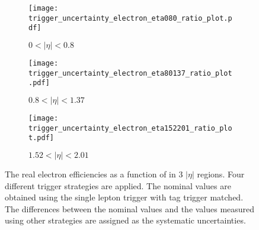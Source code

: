 \begin{figure}[htbp]
    \begin{subfigure}[b]{0.32\textwidth}
        \begin{center}
            \texttt{[image: trigger\_uncertainty\_electron\_eta080\_ratio\_plot.pdf]}
            \caption{$0 < |\eta| < 0.8$}
        \end{center}
    \end{subfigure}
    \begin{subfigure}[b]{0.32\textwidth}
        \begin{center}
            \texttt{[image: trigger\_uncertainty\_electron\_eta80137\_ratio\_plot.pdf]}
            \caption{$0.8 < |\eta| < 1.37$}
        \end{center}
    \end{subfigure}
    \begin{subfigure}[b]{0.32\textwidth}
        \begin{center}
            \texttt{[image: trigger\_uncertainty\_electron\_eta152201\_ratio\_plot.pdf]}
            \caption{$1.52 < |\eta| < 2.01$}
        \end{center}
    \end{subfigure}
    \caption{The real electron efficiencies as a function of \pt in 3 $|\eta|$ regions.
    Four different trigger strategies are applied.
    The nominal values are obtained using the single lepton trigger with tag trigger matched.
    The differences between the nominal values and the values measured using other strategies are assigned as the systematic uncertainties.}
    \label{fig:app_RLE_trigger_bias_electron}
\end{figure}

